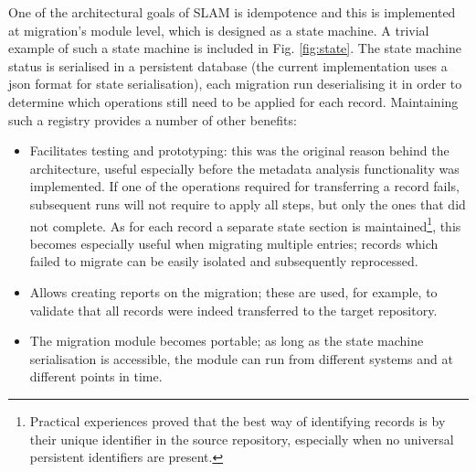 One of the architectural goals of SLAM is idempotence and this is implemented at migration's module level, which is designed as a state machine. A trivial example of such a state machine is included in Fig. \ref{fig:state}. The state machine status is serialised in a persistent database (the current implementation uses a \gls{json} format for state serialisation), each migration run deserialising it in order to determine which operations still need to be applied for each record. Maintaining such a registry provides a number of other benefits:
\begin{itemize}
    \item Facilitates testing and prototyping: this was the original reason behind the architecture, useful especially before the metadata analysis functionality was implemented. If one of the operations required for transferring a record fails, subsequent runs will not require to apply all steps, but only the ones that did not complete. As for each record a separate state section is maintained\footnote{Practical experiences proved that the best way of identifying records is by their unique identifier in the source repository, especially when no universal persistent identifiers are present.}, this becomes especially useful when migrating multiple entries; records which failed to migrate can be easily isolated and subsequently reprocessed.
    \item Allows creating reports on the migration; these are used, for example, to validate that all records were indeed transferred to the target repository.
    \item The migration module becomes portable; as long as the state machine serialisation is accessible, the module can run from different systems and at different points in time.
\end{itemize}

